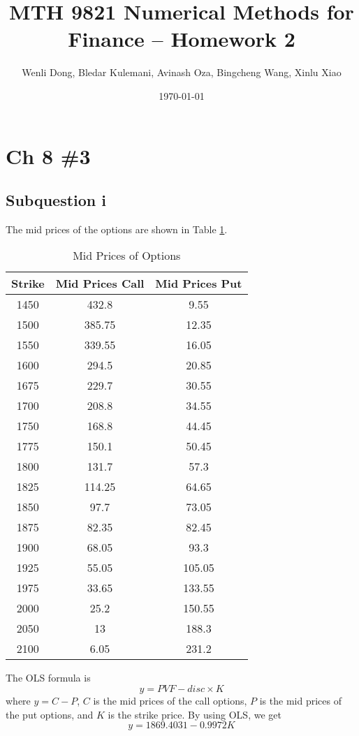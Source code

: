 \documentclass{article}
\title{MTH 9821 Numerical Methods for Finance -- Homework 2}
\author{Wenli Dong, Bledar Kulemani, Avinash Oza, Bingcheng Wang, Xinlu Xiao}
\date{\today}
\DeclareMathOperator{\1}{\mathit{1}}
\numberwithin{figure}{section} %
\numberwithin{table}{section}
\begin{document}
\maketitle

\section{Ch 8 \#3}
\subsection{Subquestion i}

The mid prices of the options are shown in Table \ref{tab:midPrice}.

	\begin{table}[hbtp]
	\centering
    \caption{\label{tab:midPrice}%
    Mid Prices of Options}
    \small
    \begin{tabular}{ccc}
    \hline\hline
    \bf{Strike} & \bf{Mid Prices Call} & \bf{Mid Prices Put}\\ 
    \hline
1450 & 432.8 & 9.55\\
1500 & 385.75 & 12.35\\
1550 & 339.55 & 16.05\\
1600 & 294.5 & 20.85\\
1675 & 229.7 & 30.55\\
1700 & 208.8 & 34.55\\
1750 & 168.8 & 44.45\\
1775 & 150.1 & 50.45\\
1800 & 131.7 & 57.3\\
1825 & 114.25 & 64.65\\
1850 & 97.7 & 73.05\\
1875 & 82.35 & 82.45\\
1900 & 68.05 & 93.3\\
1925 & 55.05 & 105.05\\
1975 & 33.65 & 133.55\\
2000 & 25.2 & 150.55\\
2050 & 13 & 188.3\\
2100 & 6.05 & 231.2\\
    \hline\hline
    \end{tabular}
    \end{table}
    
The OLS formula is
	\begin{equation*}
	y = PVF - disc \times K
	\end{equation*}
where $y = C - P$, $C$ is the mid prices of the call options, $P$ is the mid prices of the put options, and $K$ is the strike price. By using OLS, we get
	\begin{equation*}
	y = 1869.4031 - 0.9972K
	\end{equation*}
	
\end{document}
